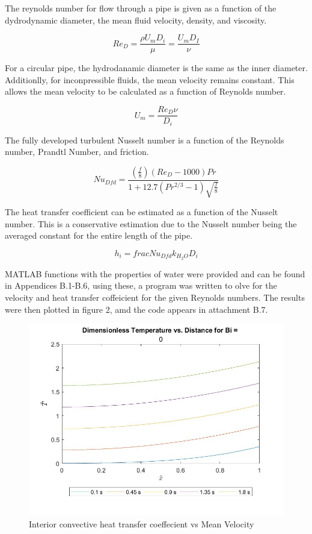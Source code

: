 \documentclass[conf]{new-aiaa}
\begin{document}
The reynolds number for flow through a pipe is given as a function of the dydrodynamic diameter, the mean fluid velocity, density, and viscosity. 

\begin{equation}
\label{sample:equation}
   Re_D=\frac{\rho U_m D_i}{\mu}=\frac{U_m D_I}{\nu}
\end{equation}

For a circular pipe, the hydrodanamic diameter is the same as the inner diameter. Additionlly, for inconpressible fluids, the mean velocity remains constant. This allows the mean velocity to be calculated as a function of Reynolds number.

\begin{equation}
\label{sample:equation}
   U_m = \frac{Re_D \nu}{D_i}
\end{equation} 

The fully developed turbulent Nusselt number is a function of the Reynolds number, Prandtl Number, and friction. 

\begin{equation}
\label{sample:equation}
   Nu_{Dfd}=\frac{\left(\frac{f}{8}\right)(Re_D-1000)Pr}{1+12.7(Pr^{2/3}-1)\sqrt{\frac{f}{8}}}
\end{equation}

The heat transfer coefficient can be estimated as a function of the Nusselt number. This is a conservative estimation due to the Nusselt number being the averaged constant for the entire length of the pipe.

\begin{equation}
\label{sample:equation}
  h_i=frac{Nu_{Dfd}k_{H_2O}}{D_i}
\end{equation}

MATLAB functions with the properties of water were provided and can be found in Appendices B.1-B.6, using these, a program was written to olve for the velocity and heat transfer coffeicient for the given Reynolds numbers. The results were then plotted in figure 2, amd the code appears in attachment B.7.

\begin{figure}[hbt!]
\centering
\includegraphics[width=.5\textwidth]{Bi0.jpg}
\caption{Interior convective heat transfer coeffecient vs Mean Velocity}
\end{figure}
\end{document}
